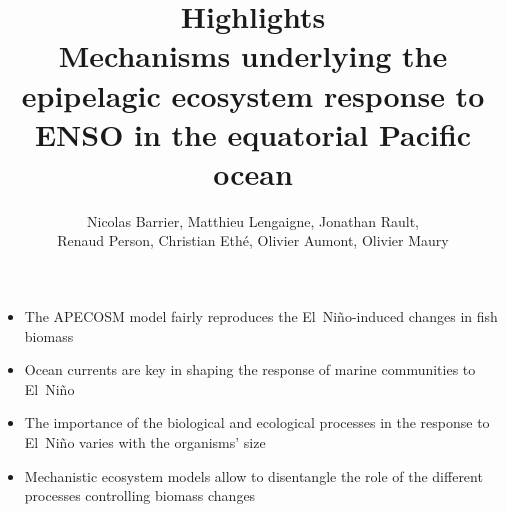\documentclass[12pt]{article}
\author{Nicolas Barrier, Matthieu Lengaigne, Jonathan Rault,\\Renaud Person, Christian Eth\'{e}, Olivier Aumont, Olivier Maury}
\title{Highlights\\
\large 
Mechanisms underlying the epipelagic ecosystem
response to ENSO in the equatorial Pacific ocean}
\newcommand\nino{El~Ni\~no}
\begin{document}
\maketitle

\begin{itemize}

\item{The APECOSM model fairly reproduces the \nino{}-induced changes in fish biomass}

\item{Ocean currents are key in shaping
the response of marine communities to \nino{}}

\item{The importance of the biological and ecological processes in the response to \nino{} varies with the organisms' size}

\item{Mechanistic ecosystem
models allow to disentangle the role of the different processes controlling biomass changes}

\end{itemize}
\end{document}
